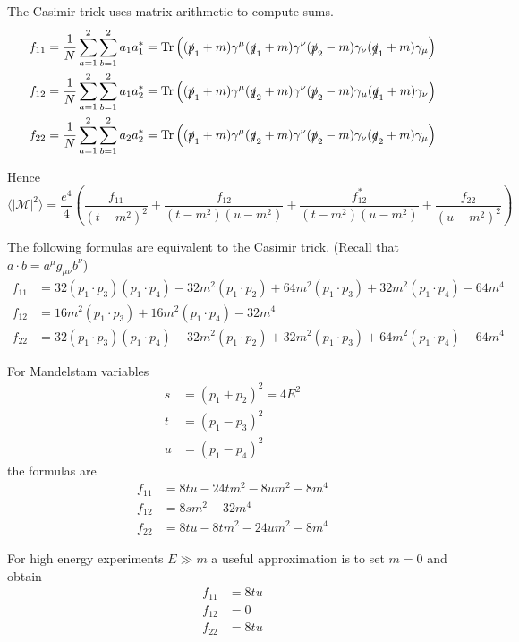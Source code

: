 \documentclass[12pt]{article}
\begin{document}
The Casimir trick uses matrix arithmetic to compute sums.
\begin{align*}
f_{11}&=\frac{1}{N} \sum_{a=1}^2\sum_{b=1}^2 a_1a_1^*=\mathop{\rm Tr}
\left(
(\slashed{p}_1+m)\gamma^\mu(\slashed{q}_1+m)\gamma^\nu(\slashed{p}_2-m)\gamma_\nu(\slashed{q}_1+m)\gamma_\mu
\right)
\\
f_{12}&=\frac{1}{N} \sum_{a=1}^2\sum_{b=1}^2 a_1a_2^*=\mathop{\rm Tr}
\left(
(\slashed{p}_1+m)\gamma^\mu(\slashed{q}_2+m)\gamma^\nu(\slashed{p}_2-m)\gamma_\mu(\slashed{q}_1+m)\gamma_\nu
\right)
\\
f_{22}&=\frac{1}{N} \sum_{a=1}^2\sum_{b=1}^2 a_2a_2^*=\mathop{\rm Tr}
\left(
(\slashed{p}_1+m)\gamma^\mu(\slashed{q}_2+m)\gamma^\nu(\slashed{p}_2-m)\gamma_\nu(\slashed{q}_2+m)\gamma_\mu
\right)
\end{align*}

Hence
\begin{equation*}
\langle|\mathcal{M}|^2\rangle
=
\frac{e^4}{4}
\left(
\frac{f_{11}}{(t-m^2)^2}
+\frac{f_{12}}{(t-m^2)(u-m^2)}
+\frac{f_{12}^*}{(t-m^2)(u-m^2)}
+\frac{f_{22}}{(u-m^2)^2}
\right)
\end{equation*}

The following formulas are equivalent to the Casimir trick.
(Recall that $a\cdot b=a^\mu g_{\mu\nu}b^\nu$)
\begin{align*}
f_{11}&=
 32 (p_1 \cdot p_3) (p_1 \cdot p_4) -
 32 m^2 (p_1 \cdot p_2) +
 64 m^2 (p_1 \cdot p_3) +
 32 m^2 (p_1 \cdot p_4) - 64 m^4
\\
f_{12}&=
 16 m^2 (p_1 \cdot p_3) +
 16 m^2 (p_1 \cdot p_4) - 32 m^4
\\
f_{22}&=
 32 (p_1 \cdot p_3) (p_1 \cdot p_4) -
 32 m^2 (p_1 \cdot p_2) +
 32 m^2 (p_1 \cdot p_3) +
 64 m^2 (p_1 \cdot p_4) - 64 m^4
\end{align*}

For Mandelstam variables
\begin{align*}
s&=(p_1+p_2)^2=4E^2
\\
t&=(p_1-p_3)^2
\\
u&=(p_1-p_4)^2
\end{align*}
the formulas are
\begin{align*}
f_{11}&=8 t u - 24 t m^2 - 8 u m^2 - 8 m^4
\\
f_{12}&=8 s m^2 - 32 m^4
\\
f_{22}&=8 t u - 8 t m^2 - 24 u m^2 - 8 m^4
\end{align*}

For high energy experiments $E\gg m$ a useful approximation is to set $m=0$ and obtain
\begin{align*}
f_{11}&=8tu
\\
f_{12}&=0
\\
f_{22}&=8tu
\end{align*}
\end{document}
